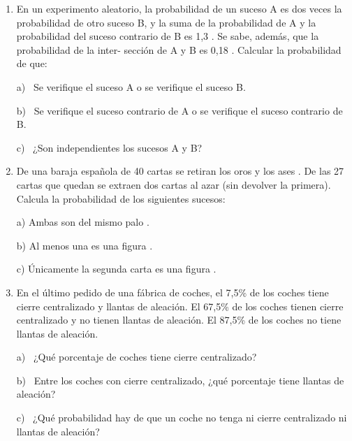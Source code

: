\begin{adjustwidth}{5mm}{5mm}
\begin{enumerate}[PB. 1. ]
\item En un experimento aleatorio, la probabilidad de un suceso A es dos veces la probabilidad de otro suceso B, y la suma de la probabilidad de A y la probabilidad del suceso contrario de B es 1,3 . Se sabe, además, que la probabilidad de la inter- sección de A y B es 0,18 . Calcular la probabilidad de que: 

a)  Se verifique el suceso A o se verifique el suceso B. 

b)  Se verifique el suceso contrario de A o se verifique el suceso contrario de B. 

c)  ¿Son independientes los sucesos A y B? 

\hspace{-1cm}\vspace{1cm}


\item De una baraja española de 40 cartas se retiran los oros y los ases . De las 27 cartas que quedan se extraen dos cartas al azar (sin devolver la primera). Calcula la probabilidad de los siguientes sucesos: 

a) Ambas son del mismo palo .

b) Al menos una es una figura .

c) Únicamente la segunda carta es una figura . 

\hspace{-1cm}\vspace{1cm}


\item  En el último pedido de una fábrica de coches, el 7,5\% de los coches tiene cierre centralizado y llantas de aleación. El 67,5\% de los coches tienen cierre centralizado y no tienen llantas de aleación. El 87,5\% de los coches no tiene llantas de aleación. 

a)  ¿Qué porcentaje de coches tiene cierre centralizado? 

b)  Entre los coches con cierre centralizado, ¿qué porcentaje tiene llantas de aleación? 

c)  ¿Qué probabilidad hay de que un coche no tenga ni cierre centralizado ni llantas de aleación? 

\hspace{-1cm}\vspace{1cm}


\end{enumerate}
\end{adjustwidth}
